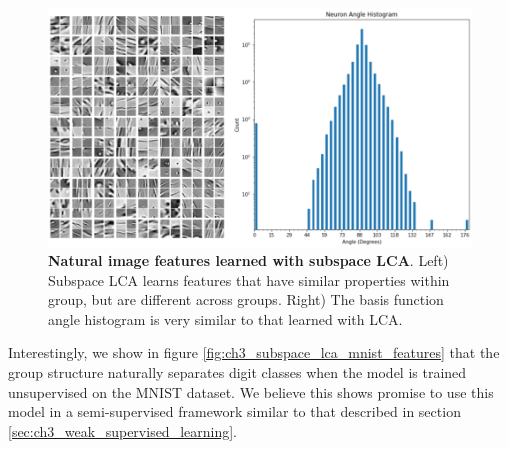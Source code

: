\begin{figure}\label{fig:ch3_subspace_lca_features}
    \centering
    \includegraphics[width=\textwidth]{figures/subspace_lca_features.png}
    \caption{\textbf{Natural image features learned with subspace LCA}. Left) Subspace LCA learns features that have similar properties within group, but are different across groups. Right) The basis function angle histogram is very similar to that learned with LCA.}
\end{figure}

Interestingly, we show in figure \ref{fig:ch3_subspace_lca_mnist_features} that the group structure naturally separates digit classes when the model is trained unsupervised on the MNIST dataset. We believe this shows promise to use this model in a semi-supervised framework similar to that described in section \ref{sec:ch3_weak_supervised_learning}.

